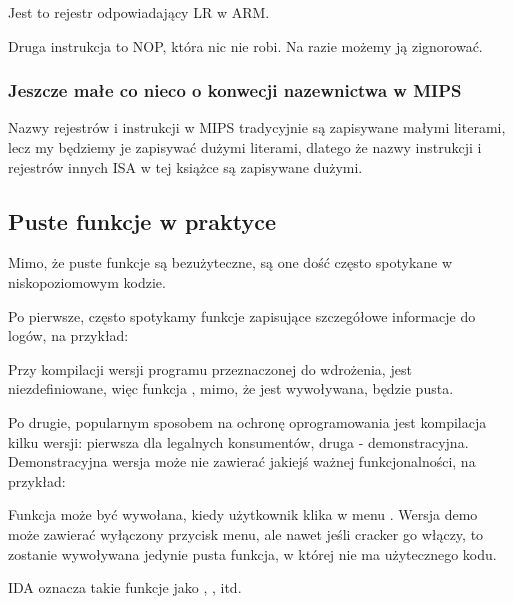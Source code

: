 Jest to rejestr odpowiadający \ac{LR} w ARM.

Druga instrukcja to \ac{NOP}, która nic nie robi.
Na razie możemy ją zignorować.

\subsubsection{Jeszcze małe co nieco o konwecji nazewnictwa w MIPS}
Nazwy rejestrów i instrukcji w MIPS tradycyjnie są zapisywane małymi literami,
lecz my będziemy je zapisywać dużymi literami, dlatego że nazwy instrukcji i rejestrów innych 
\ac{ISA} w tej książce są zapisywane dużymi.

\subsection{Puste funkcje w praktyce}

Mimo, że puste funkcje są bezużyteczne, są one dość często spotykane w niskopoziomowym kodzie.

Po pierwsze, często spotykamy funkcje zapisujące szczegółowe informacje do logów, na przykład:



Przy kompilacji wersji programu przeznaczonej do wdrożenia,  jest niezdefiniowane,
więc funkcja , mimo, że jest wywoływana, będzie pusta.

Po drugie, popularnym sposobem na ochronę oprogramowania jest kompilacja kilku wersji: pierwsza dla legalnych konsumentów, druga - demonstracyjna.
Demonstracyjna wersja może nie zawierać jakiejś ważnej funkcjonalności, na przykład:



Funkcja  może być wywołana, kiedy użytkownik klika w menu .
Wersja demo może zawierać wyłączony przycisk menu, ale nawet jeśli cracker go włączy,
to zostanie wywoływana jedynie pusta funkcja, w której nie ma użytecznego kodu.

IDA oznacza takie funkcje jako , , itd.


